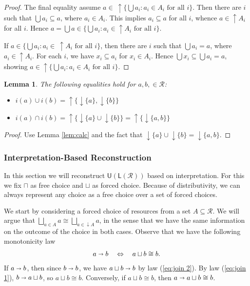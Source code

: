 \documentclass[12pt]{article}
\theoremstyle{definition}
\theoremstyle{plain}
\newtheorem{lemma}{Lemma}[section]
\theoremstyle{plain}
\theoremstyle{plain}
\theoremstyle{plain}
\theoremstyle{remark}
\theoremstyle{remark}
\newcommand{\mc}[1]{\mathcal{#1}}
\newcommand{\sub}{\subseteq}
\newcommand{\low}{\mathsf{L}}
\newcommand{\upper}{\mathsf{U}}
\newcommand{\upc}[1]{{\uparrow #1}}
\newcommand{\lwc}[1]{{\downarrow #1}}
\begin{document}
\begin{tcolorbox}[title = Calculation Rules]
\begin{proof}
		The final equality assume $a \in \: \uparrow \!\! \{\bigcup a_i: a_i \in A_i \text{ for all } i \}$. Then there are $i$ such that $\bigcup a_i \sub a$, where $a_i \in A_i$. This implies $a_i \sub a$ for all $i$, whence $a \in \upc{A_i}$ for all $i$. Hence $a = \bigcup a  \in \{\bigcup a_i: a_i \in \upc{A_i} \text{ for all } i \}$.
		
		If $a \in \{\bigcup a_i: a_i \in \: \uparrow \!\! A_i \text{ for all } i \}$, then there are $i$ such that $\bigcup a_i = a$, where $a_i \in \upc{A_i}$. For each $i$, we have $x_i \sub a_i$ for $x_i \in A_i$. Hence $\bigcup x_i \sub \bigcup a_i = a$, showing $a \in \upc{\{\bigcup a_i: a_i \in A_i \text{ for all } i \}}$.
	\end{proof}
	\begin{lemma} The following equalities hold for $a,b, \in \mc{R}$:
	\begin{itemize}
		\item[(i)] $i(a) \cup i(b) = \uparrow \{\downarrow \{a\}, \downarrow \{b\}\}$
		\item[(ii)] $i(a) \cap i(b) = \uparrow \{ {\downarrow \{a\}} \cup {\downarrow \{b\}}\} = \uparrow \{ \downarrow \{a,b\}\} $
	\end{itemize}
	\end{lemma}
	\begin{proof}
		Use Lemma \ref{lem:calc} and the fact that ${\downarrow \{a\}} \cup {\downarrow \{b\}} = \downarrow \{a,b\}$.
	\end{proof}
\end{tcolorbox}

\subsubsection{Interpretation-Based Reconstruction}\label{sec:reconstruction}
In this section we will reconstruct $\upper(\low(\mc{R}))$ based on interpretation. For this we fix $\sqcap$ as free choice and $\sqcup$ as forced choice. Because of distributivity, we can always represent any choice as a free choice over a set of forced choices. 

We start by considering a forced choice of resources from a set $A \sub \mc{R}$. We will argue that $\bigsqcup_{a \in A} a \cong \bigsqcup_{a \in \lwc{A}} a $, in the sense that we have the same information on the outcome of the choice in both cases. Observe that we have the following monotonicity law
$$a \shortrightarrow b \quad \Leftrightarrow \quad  a \sqcup b \cong b.$$
If $a \shortrightarrow b$, then since $b \shortrightarrow b$, we have $a \sqcup b \shortrightarrow b$ by law (\ref{eq:join 2}). By law (\ref{eq:join 1}), $b \shortrightarrow a \sqcup b$, so $a \sqcup b \cong b$. Conversely, if $a \sqcup b \cong b$, then $a \shortrightarrow a \sqcup b \cong b$.
\end{document}
